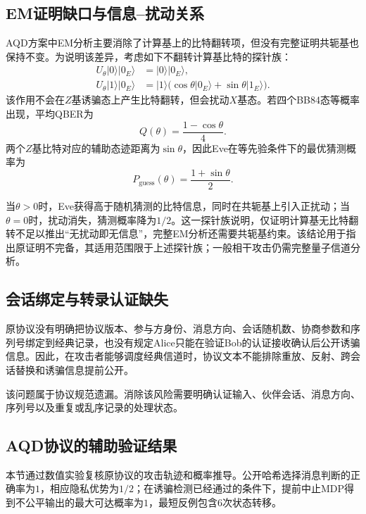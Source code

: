 \documentclass[UTF8,10pt,a4paper]{ctexart}
\theoremstyle{aqdplain}
\begin{document}
\subsection{EM证明缺口与信息--扰动关系}
\label{sec:em-gap}

AQD方案中EM分析主要消除了计算基上的比特翻转项\citep{zhang2025aqd}，但没有完整证明共轭基也保持不变。为说明该差异，考虑如下不翻转计算基比特的探针族：
\begin{align}
U_\theta|0\rangle|0_E\rangle&=|0\rangle|0_E\rangle,\nonumber\\
U_\theta|1\rangle|0_E\rangle&=|1\rangle\bigl(\cos\theta|0_E\rangle
+\sin\theta|1_E\rangle\bigr).
\label{eq:probe}
\end{align}
该作用不会在$Z$基诱骗态上产生比特翻转，但会扰动$X$基态。若四个BB84态等概率出现，平均QBER为
\begin{equation}
Q(\theta)=\frac{1-\cos\theta}{4}.
\label{eq:qbertheta}
\end{equation}
两个$Z$基比特对应的辅助态迹距离为$\sin\theta$，因此Eve在等先验条件下的最优猜测概率为\citep{helstrom1976}
\begin{equation}
P_{\mathrm{guess}}(\theta)=\frac{1+\sin\theta}{2}.
\label{eq:helstrom}
\end{equation}

当$\theta>0$时，Eve获得高于随机猜测的比特信息，同时在共轭基上引入正扰动；当$\theta=0$时，扰动消失，猜测概率降为$1/2$。这一探针族说明，仅证明计算基无比特翻转不足以推出“无扰动即无信息”，完整EM分析还需要共轭基约束。该结论用于指出原证明不完备，其适用范围限于上述探针族；一般相干攻击仍需完整量子信道分析。

\subsection{会话绑定与转录认证缺失}

原协议没有明确把协议版本、参与方身份、消息方向、会话随机数、协商参数和序列号绑定到经典记录，也没有规定Alice只能在验证Bob的认证接收确认后公开诱骗信息\citep{zhang2025aqd}。因此，在攻击者能够调度经典信道时，协议文本不能排除重放、反射、跨会话替换和诱骗信息提前公开。

该问题属于协议规范遗漏。消除该风险需要明确认证输入、伙伴会话、消息方向、序列号以及重复或乱序记录的处理状态。

\subsection{AQD协议的辅助验证结果}

本节通过数值实验复核原协议的攻击轨迹和概率推导。公开哈希选择消息判断的正确率为$1$，相应隐私优势为$1/2$；在诱骗检测已经通过的条件下，提前中止MDP得到不公平输出的最大可达概率为$1$，最短反例包含6次状态转移。
\end{document}
